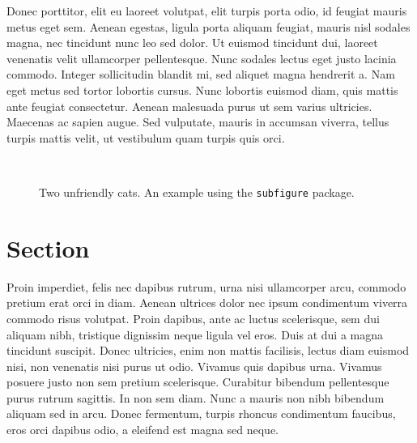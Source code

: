 Donec porttitor, elit eu laoreet volutpat, elit turpis porta odio, id feugiat mauris metus eget sem. Aenean egestas, ligula porta aliquam feugiat, mauris nisl sodales magna, nec tincidunt nunc leo sed dolor. Ut euismod tincidunt dui, laoreet venenatis velit ullamcorper pellentesque. Nunc sodales lectus eget justo lacinia commodo. Integer sollicitudin blandit mi, sed aliquet magna hendrerit a. Nam eget metus sed tortor lobortis cursus. Nunc lobortis euismod diam, quis mattis ante feugiat consectetur. Aenean malesuada purus ut sem varius ultricies. Maecenas ac sapien augue. Sed vulputate, mauris in accumsan viverra, tellus turpis mattis velit, ut vestibulum quam turpis quis orci. 

\begin{figure}[tbp]
\begin{center}
 \ \ 
\end{center}
\caption{Two unfriendly cats.  An example using the \texttt{subfigure}  package.}
\label{fig:2.1}
\end{figure}

\section{Section}
Proin imperdiet, felis nec dapibus rutrum, urna nisi ullamcorper arcu, commodo \cite{Kumar2000lr} pretium erat orci in diam. Aenean ultrices dolor nec ipsum condimentum viverra commodo risus volutpat. Proin dapibus, ante ac luctus scelerisque, sem dui aliquam nibh, tristique dignissim neque ligula vel eros. Duis at dui a magna tincidunt suscipit. Donec ultricies, enim non mattis facilisis, lectus diam euismod nisi, non venenatis nisi purus ut odio. Vivamus quis dapibus urna. Vivamus posuere justo non sem pretium scelerisque. Curabitur bibendum pellentesque purus rutrum sagittis. In non sem diam. Nunc a mauris non nibh bibendum aliquam sed in arcu. Donec fermentum, turpis rhoncus condimentum faucibus, eros orci dapibus odio, a eleifend est magna sed neque. 

